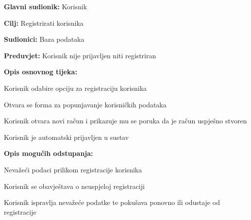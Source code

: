 \noindent {}
\begin{packed_item}

	\item \textbf{Glavni sudionik:} Korisnik
	\item \textbf{Cilj:} Registrirati korisnika
	\item \textbf{Sudionici:} Baza podataka
	\item \textbf{Preduvjet:} Korisnik nije prijavljen niti registriran
	\item \textbf{Opis osnovnog tijeka:}
	
	\item[] \begin{packed_enum}
		
		\item Korisnik odabire opciju za registraciju korisnika
		\item Otvara se forma za popunjavanje korisničkih podataka
		\item Korisnik otvara novi račun i prikazuje mu se poruka da je račun uspješno stvoren
		\item Korisnik je automatski prijavljen u sustav

	\end{packed_enum}

	\item  \textbf{Opis mogućih odstupanja:}
	
	\item[] \begin{packed_item}
	
		\item[3.a] Nevažeći podaci prilikom registracije korisnika
		\item[] \begin{packed_enum}
			
			\item Korisnik se obavještava o neuspjeloj registraciji
			\item Korisnik ispravlja nevažeće podatke te pokušava ponovno ili odustaje od registracije
			
		\end{packed_enum}
		
	\end{packed_item}
\end{packed_item}

\pagebreak

